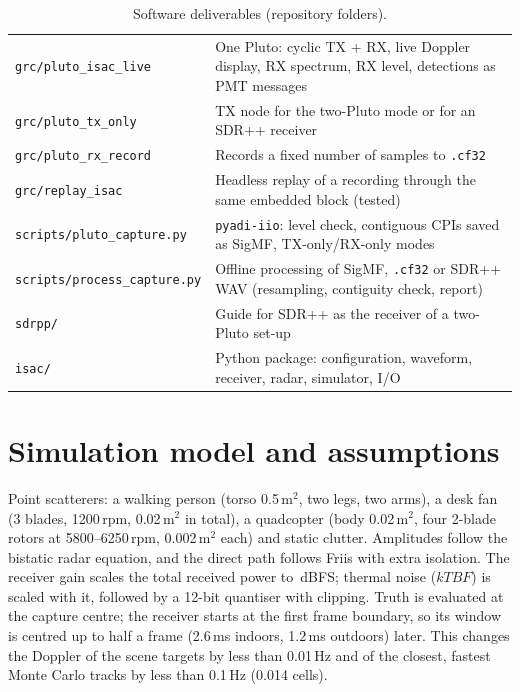 \documentclass[10pt,a4paper]{article}
\newcommand{\code}[1]{\texttt{#1}}
\begin{document}
\begin{table}[htbp]
\centering\small
\caption{Software deliverables (repository folders).}
\begin{tabularx}{\linewidth}{lL}
\toprule
\code{grc/pluto\_isac\_live} & One Pluto: cyclic TX + RX, live Doppler display, RX spectrum, RX level, detections as PMT messages\\
\code{grc/pluto\_tx\_only} & TX node for the two-Pluto mode or for an SDR++ receiver\\
\code{grc/pluto\_rx\_record} & Records a fixed number of samples to \code{.cf32}\\
\code{grc/replay\_isac} & Headless replay of a recording through the same embedded block (tested)\\
\code{scripts/pluto\_capture.py} & \code{pyadi-iio}: level check, contiguous CPIs saved as SigMF, TX-only/RX-only modes\\
\code{scripts/process\_capture.py} & Offline processing of SigMF, \code{.cf32} or SDR++ WAV (resampling, contiguity check, report)\\
\code{sdrpp/} & Guide for SDR++ as the receiver of a two-Pluto set-up\\
\code{isac/} & Python package: configuration, waveform, receiver, radar, simulator, I/O\\
\bottomrule
\end{tabularx}
\end{table}

\section{Simulation model and assumptions}
Point scatterers: a walking person (torso 0.5\,m$^2$, two legs, two arms), a desk fan (3 blades, 1200\,rpm,
0.02\,m$^2$ in total), a quadcopter (body 0.02\,m$^2$, four 2-blade rotors at 5800--6250\,rpm, 0.002\,m$^2$ each)
and static clutter. Amplitudes follow the bistatic radar equation, and the direct path follows Friis with extra
isolation. The receiver gain scales the total received power to \LvlI\,dBFS; thermal noise ($kTBF$) is scaled with it,
followed by a 12-bit quantiser with clipping. Truth is evaluated at the capture centre; the receiver starts at the
first frame boundary, so its window is centred up to half a frame (2.6\,ms indoors, 1.2\,ms outdoors) later. This
changes the Doppler of the scene targets by less than 0.01\,Hz and of the closest, fastest Monte Carlo tracks by less
than 0.1\,Hz (0.014 cells).
\end{document}
